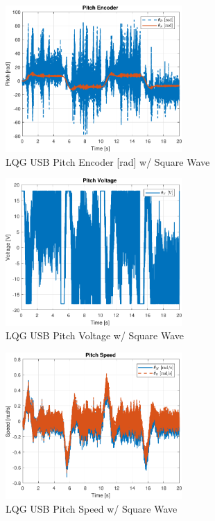 \documentclass[fontsize=11pt, %
                             paper=letter, %
                             openany, %
                             captions=tableheading,
                             index=totoc,
                             hyperref]{labbook}
\begin{document}
\begin{addmargin}[0cm]{0cm}
\begin{figure}[h]
  \centering
  \includegraphics[width=0.6\textwidth]{figs/matlab/LQG/LQG_USB/Pitch_Pos_Rad_LQG_USB_SQU}
  \caption{LQG USB Pitch Encoder [rad] w/ Square Wave}
  \label{fig:Pitch_Pos_Rad_LQG_USB_SQU}
\end{figure}

\begin{figure}[h]
  \centering
  \includegraphics[width=0.6\textwidth]{figs/matlab/LQG/LQG_USB/Pitch_Volt_LQG_USB_SQU}
  \caption{LQG USB Pitch Voltage w/ Square Wave}
  \label{fig:Pitch_Volt_LQG_USB_SQU}
\end{figure}

\begin{figure}[h]
  \centering
  \includegraphics[width=0.6\textwidth]{figs/matlab/LQG/LQG_USB/Pitch_Speed_LQG_USB_SQU}
  \caption{LQG USB Pitch Speed w/ Square Wave}
  \label{fig:Pitch_Speed_LQG_USB_SQU}
\end{figure}


\end{addmargin}
\end{document}

